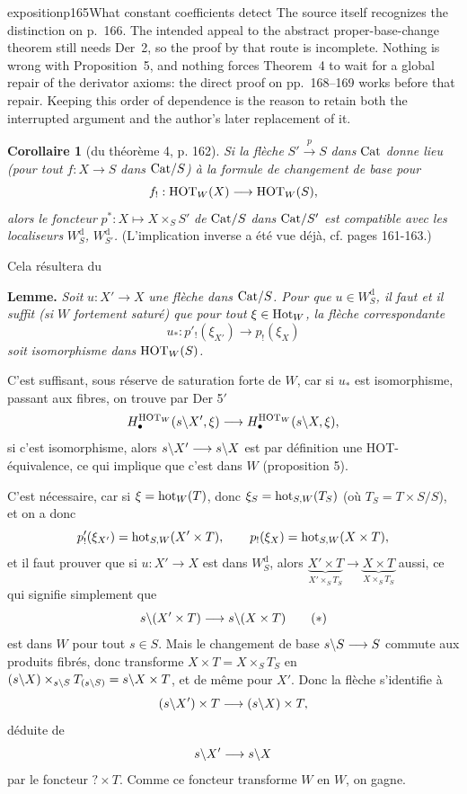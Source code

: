 \begin{dcomment}{exposition}{p165}{What constant coefficients detect}
The source itself recognizes the distinction on p.~166. The intended appeal to the abstract proper-base-change theorem still needs Der~2, so the proof by that route is incomplete. Nothing is wrong with Proposition~5, and nothing forces Theorem~4 to wait for a global repair of the derivator axioms: the direct proof on pp.~168--169 works before that repair. Keeping this order of dependence is the reason to retain both the interrupted argument and the author's later replacement of it.
\end{dcomment}


\noindent{}%
\textbf{Corollaire 1} (du théorème 4, p. 162). \textit{Si la flèche} $S' \xrightarrow{p} S$ \textit{dans} $\mathrm{Cat}$ \textit{donne lieu (pour tout} $f : X \longrightarrow S$ \textit{dans} $\mathrm{Cat}/S$\textit{) à la formule de changement de base pour}
\[
f_! : \mathrm{HOT}_W(X) \longrightarrow \mathrm{HOT}_W(S),
\]
\textit{alors le foncteur} $p^* : X \longmapsto X \times_S S'$ \textit{de} $\mathrm{Cat}/S$ \textit{dans} $\mathrm{Cat}/S'$ \textit{est compatible avec les localiseurs} $W^{\mathrm{d}}_{S}$\textit{,} $W^{\mathrm{d}}_{S'}$\textit{.} (L'implication inverse a été vue déjà, cf. pages 161-163.)

Cela résultera du

\noindent\textbf{Lemme.} \textit{Soit} $u : X' \longrightarrow X$ \textit{une flèche dans} $\mathrm{Cat}/S$\textit{. Pour que} $u \in W^{\mathrm{d}}_{S}$\textit{, il faut et il suffit (si $W$} \textit{fortement saturé) que pour tout} $\xi \in \mathrm{Hot}_W$\textit{, la flèche correspondante}
\[
u_* : p'_!(\xi_{X'}) \longrightarrow p_!(\xi_X)
\]
\textit{soit} \textit{isomorphisme dans} $\mathrm{HOT}_W(S)$\textit{.}

C'est suffisant, sous réserve de saturation forte de $W$, car si $u_*$ est isomorphisme, passant aux fibres, on trouve par Der 5$'$
\[
H_\bullet^{\mathrm{HOT}_W}(s\backslash X', \xi) \longrightarrow H_\bullet^{\mathrm{HOT}_W}(s\backslash X, \xi),
\]
si c'est isomorphisme, alors $s\backslash X' \longrightarrow s\backslash X$ est par définition une HOT-équivalence, ce qui implique que c'est dans $W$ (proposition 5).

C'est nécessaire, car si $\xi = \mathrm{hot}_W(T)$, donc $\xi_S = \mathrm{hot}_{S,W}(T_S)$ (où $T_S = T \times S/S$), et on a donc
\[
p'_!(\xi_{X'}) = \mathrm{hot}_{S,W}(X' \times T), \qquad p_!(\xi_X) = \mathrm{hot}_{S,W}(X \times T),
\]
et il faut prouver que si $u : X' \longrightarrow X$ est dans $W^{\mathrm{d}}_{S}$, alors $\underbrace{X' \times T}_{X' \times_S T_S} \longrightarrow \underbrace{X \times T}_{X \times_S T_S}$ aussi, ce qui signifie simplement que
\[
s\bs(X' \times T) \longrightarrow s\bs(X \times T) \tag*{$(*)$}
\]
est dans $W$ pour tout $s \in S$. Mais le changement de base $s\backslash S \longrightarrow S$ commute aux produits fibrés, donc transforme $X \times T = X \times_S T_S$ en $(s\backslash X) \times_{s\backslash S} T_{(s\backslash S)} = s\backslash X \times T$, et de même pour $X'$. Donc la flèche s'identifie à
\[
(s\backslash X') \times T \longrightarrow (s\backslash X) \times T,
\]
déduite de
\[
s\backslash X' \longrightarrow s\backslash X
\]
par le foncteur $? \times T$. Comme ce foncteur transforme $W$ en $W$, on gagne.

